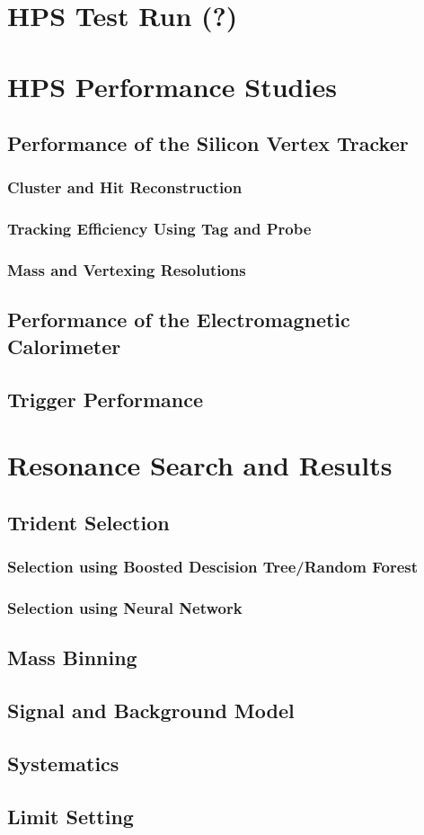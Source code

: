 \documentclass[12pt]{report}
\begin{document}
\chapter{HPS Test Run (?)}

\chapter{HPS Performance Studies}

\section{Performance of the Silicon Vertex Tracker}
\subsection{Cluster and Hit Reconstruction}
\subsection{Tracking Efficiency Using Tag and Probe}
\subsection{Mass and Vertexing Resolutions}

\section{Performance of the Electromagnetic Calorimeter}

\section{Trigger Performance}

\chapter{Resonance Search and Results}
\section{Trident Selection}
\subsection{Selection using Boosted Descision Tree/Random Forest}
\subsection{Selection using Neural Network}
\section{Mass Binning}
\section{Signal and Background Model}
\section{Systematics}
\section{Limit Setting}
\end{document}
